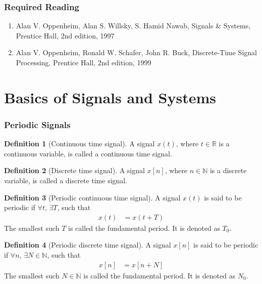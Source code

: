 \documentclass[titlepage, fleqn, a4paper, 12pt, twoside]{article}
\theoremstyle{definition}
\newtheorem{definition}{Definition}
\theoremstyle{theorem}
\begin{document}
\section{Required Reading}

\begin{enumerate}
	\item Alan V. Oppenheim, Alan S. Willsky, S. Hamid Nawab, Signals \& Systems, Prentice Hall, 2nd edition, 1997
	\item Alan V. Oppenheim, Ronald W. Schafer, John R. Buck, Discrete-Time Signal Processing, Prentice Hall, 2nd edition, 1999
\end{enumerate}

\clearpage
{}

\part{Basics of Signals and Systems}

\section{Periodic Signals}

\begin{definition}[Continuous time signal]
	A signal $x(t)$, where $t \in \mathbb{R}$ is a continuous variable, is called a continuous time signal.
\end{definition}

\begin{definition}[Discrete time signal]
	A signal $x[n]$, where $n \in \mathbb{N}$ is a discrete variable, is called a discrete time signal.
\end{definition}

\begin{definition}[Periodic continuous time signal]
	A signal $x(t)$ is said to be periodic if $\forall t$, $\exists T$, such that
	\begin{align*}
		x(t) & = x(t + T)
	\end{align*}
	The smallest such $T$ is called the fundamental period.
	It is denoted as $T_0$.
\end{definition}

\begin{definition}[Periodic discrete time signal]
	A signal $x[n]$ is said to be periodic if $\forall n$, $\exists N \in \mathbb{N}$, such that
	\begin{align*}
		x[n] & = x[n + N]
	\end{align*}
	The smallest such $N \in \mathbb{N}$ is called the fundamental period.
	It is denoted as $N_0$.
\end{definition}
\end{document}
